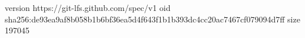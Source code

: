 version https://git-lfs.github.com/spec/v1
oid sha256:de93ea9af8b058b1b6bf36ea5d4f643f1b1b393dc4cc20ac7467cf079094d7ff
size 197045

